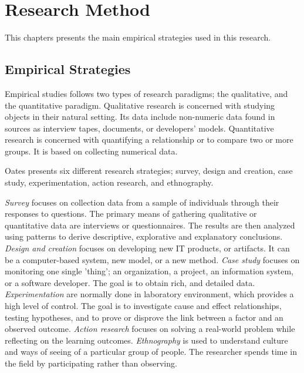 \chapter{Research Method}
This chapters presents the main empirical strategies used in this research.

\section{Empirical Strategies}
Empirical studies follows two types of research paradigms; the qualitative, and the quantitative paradigm\cite{Wohlin:2000:ESE:330775}. Qualitative research is concerned with studying objects in their natural setting\cite{Wohlin:2000:ESE:330775}. Its data include non-numeric data found in sources as interview tapes, documents, or developers' models\cite{Oates:2006:RIS:1202299}. Quantitative research is concerned with quantifying a relationship or to compare two or more groups\cite{Wohlin:2000:ESE:330775}. It is based on collecting numerical data\cite{Oates:2006:RIS:1202299}.

Oates\cite{Oates:2006:RIS:1202299} presents six different research strategies; survey, design and creation, case study, experimentation, action research, and ethnography. 

\textit{{Survey}} focuses on collection data from a sample of individuals through their responses to questions. The primary means of gathering qualitative or quantitative data are interviews or questionnaires. The results are then analyzed using patterns to derive descriptive, explorative and explanatory conclusions. \textit{{Design and creation}} focuses on developing new IT products, or artifacts. It can be a computer-based system, new model, or a new method. \textit{{Case study}} focuses on monitoring one single 'thing'; an organization, a project, an information system, or a software developer. The goal is to obtain rich, and detailed data. \textit{{Experimentation}} are normally done in laboratory environment, which provides a high level of control. The goal is to investigate cause and effect relationships, testing hypotheses, and to prove or disprove the link between a factor and an observed outcome. \textit{{Action research}} focuses on solving a real-world problem while reflecting on the learning outcomes. \textit{{Ethnography}} is used to understand culture and ways of seeing of a particular group of people. The researcher spends time in the field by participating rather than observing.

